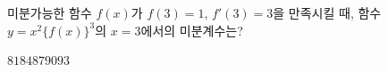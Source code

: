 미분가능한 함수 $f(x)$가 $f(3)=1$, $f'(3)=3$을 만족시킬 때, 함수 $y=x^2\{f(x)\}^3$의 $x=3$에서의 미분계수는?
\begin{choices32}{$81$}{$84$}{$87$}{$90$}{$93$}\end{choices32}
